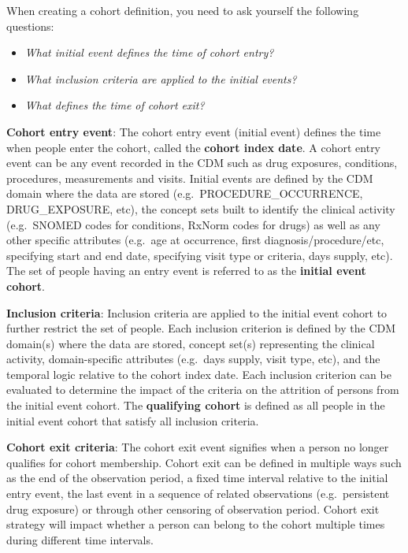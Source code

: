 \documentclass[11pt]{book}
\providecommand{\tightlist}{%
  \setlength{\itemsep}{0pt}\setlength{\parskip}{0pt}}
\theoremstyle{definition}
\theoremstyle{definition}
\theoremstyle{definition}
\theoremstyle{remark}
\begin{document}
When creating a cohort definition, you need to ask yourself the
following questions:

\begin{itemize}
\tightlist
\item
  \emph{What initial event defines the time of cohort entry?}
\item
  \emph{What inclusion criteria are applied to the initial events?}
\item
  \emph{What defines the time of cohort exit?}
\end{itemize}

\textbf{Cohort entry event}: The cohort entry event (initial event)
defines the time when people enter the cohort, called the \textbf{cohort
index date}. A cohort entry event can be any event recorded in the CDM
such as drug exposures, conditions, procedures, measurements and visits.
Initial events are defined by the CDM domain where the data are stored
(e.g.~PROCEDURE\_OCCURRENCE, DRUG\_EXPOSURE, etc), the concept sets
built to identify the clinical activity (e.g.~SNOMED codes for
conditions, RxNorm codes for drugs) as well as any other specific
attributes (e.g.~age at occurrence, first diagnosis/procedure/etc,
specifying start and end date, specifying visit type or criteria, days
supply, etc). The set of people having an entry event is referred to as
the \textbf{initial event cohort}. 

\textbf{Inclusion criteria}: Inclusion criteria are applied to the
initial event cohort to further restrict the set of people. Each
inclusion criterion is defined by the CDM domain(s) where the data are
stored, concept set(s) representing the clinical activity,
domain-specific attributes (e.g.~days supply, visit type, etc), and the
temporal logic relative to the cohort index date. Each inclusion
criterion can be evaluated to determine the impact of the criteria on
the attrition of persons from the initial event cohort. The
\textbf{qualifying cohort} is defined as all people in the initial event
cohort that satisfy all inclusion criteria.

\textbf{Cohort exit criteria}: The cohort exit event signifies when a
person no longer qualifies for cohort membership. Cohort exit can be
defined in multiple ways such as the end of the observation period, a
fixed time interval relative to the initial entry event, the last event
in a sequence of related observations (e.g.~persistent drug exposure) or
through other censoring of observation period. Cohort exit strategy will
impact whether a person can belong to the cohort multiple times during
different time intervals.
\end{document}
